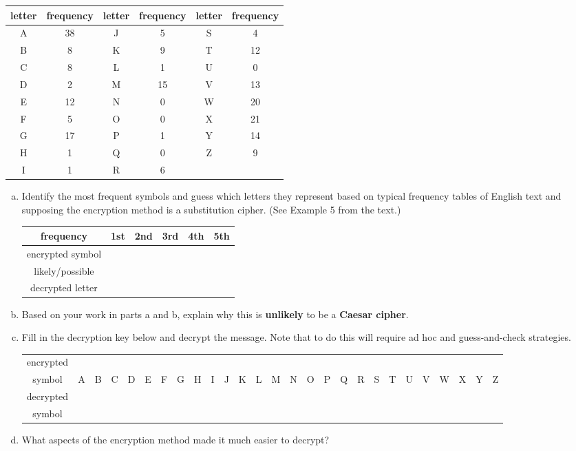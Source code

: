 \documentclass[11pt, oneside]{article}   	%
\begin{document}
	\begin{tabular}{c|c||c|c||c|c}
	letter&frequency&letter&frequency&letter&frequency\\
	\hline \hline
	A&38&J&5&S&4\\
	\hline
	B&8&K&9&T&12\\
	\hline
	C&8&L&1&U&0\\
	\hline
	D&2&M&15&V&13\\
	\hline
	E&12&N&0&W&20\\
	\hline
	F&5&O&0&X&21\\
	\hline
	G&17&P&1&Y&14\\
	\hline
	H&1&Q&0&Z&9\\
	\hline
	I&1&R&6&&\\
	\hline
	\end{tabular}
	\begin{enumerate}[(a)]
	\item Identify the most frequent symbols and guess which letters they represent based on typical frequency tables of English text and supposing the encryption method is a substitution cipher. (See Example 5 from the text.) \\
	\begin{tabular}{c||c|c|c|c|c}
	frequency&1st&2nd&3rd&4th&5th\\
	\hline
	encrypted symbol&&&&&\\
	\hline
	likely/possible&&&&&\\
	decrypted letter&&&&&\\
	\end{tabular}
	\item Based on your work in parts a and b, explain why this is \textbf{unlikely} to be a \textbf{Caesar cipher}. 
	\item Fill in the decryption key below and decrypt  the message. Note that to do this will require ad hoc and guess-and-check strategies.\\
	
\begingroup
\setlength{\tabcolsep}{4pt}
\renewcommand{\arraystretch}{0.5}
	\hspace*{-0.2in}\begin{tabular}{c|c|c|c|c|c|c|c|c|c|c|c|c|c|c|c|c|c|c|c|c|c|c|c|c|c|c}
	encrypted &&&&&&&&&& &&&&&&&&&& &&&&&&\\
	symbol&A&B&C&D&E&F&G&H&I&J&K&L&M&N&O&P&Q&R&S&T&U&V&W&X&Y&Z\\ \hline
	decrypted &&&&&&&&&& &&&&&&&&&& &&&&&&\\
	symbol&&&&&&&&&& &&&&&&&&&& &&&&&&\\ 
	\end{tabular}
	
\endgroup

\item What aspects of the encryption method made it much easier to decrypt?
	\end{enumerate}
\end{document}
